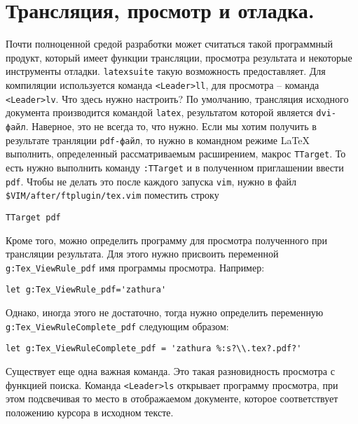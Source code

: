 \documentclass[a4paper]{article}
\begin{document}
\part{Трансляция, просмотр и отладка.}
Почти полноценной средой разработки может считаться такой программный продукт, который
имеет функции трансляции, просмотра результата и некоторые инструменты отладки. \texttt{latexsuite} такую возможность
предоставляет. Для компиляции используется команда \texttt{<Leader>ll}, для просмотра -- команда
\texttt{<Leader>lv}. Что здесь нужно настроить? По умолчанию, трансляция исходного документа
производится командой \texttt{latex}, результатом которой является \texttt{dvi-файл}. 
Наверное, это не всегда то, что нужно. Если мы хотим получить в результате транляции
\texttt{pdf-файл}, то нужно в командном режиме \LaTeX{} выполнить, определенный рассматриваемым
расширением, макрос \texttt{TTarget}. То есть нужно выполнить команду \verb|:TTarget| и 
в полученном приглашении ввести \texttt{pdf}. Чтобы не делать это после каждого запуска
\texttt{vim}, нужно в файл \verb|$VIM/after/ftplugin/tex.vim| поместить строку
\begin{verbatim}
TTarget pdf
\end{verbatim}
Кроме того, можно определить программу для просмотра полученного при трансляции результата.
Для этого нужно присвоить переменной \verb|g:Tex_ViewRule_pdf| имя программы просмотра. Например:
\begin{verbatim}
let g:Tex_ViewRule_pdf='zathura'
\end{verbatim}
Однако, иногда этого не достаточно, тогда нужно определить переменную \verb|g:Tex_ViewRuleComplete_pdf| 
следующим образом:
\begin{verbatim}
let g:Tex_ViewRuleComplete_pdf = 'zathura %:s?\\.tex?.pdf?'
\end{verbatim}

Существует еще одна важная команда. Это такая разновидность просмотра с функцией поиска.
Команда \texttt{<Leader>ls} открывает программу просмотра, при этом подсвечивая то место
в отображаемом документе, которое соответствует положению курсора в исходном тексте.
\end{document}

